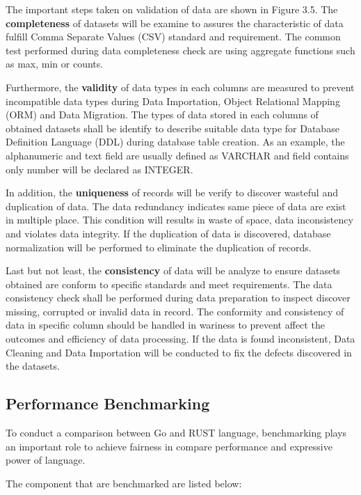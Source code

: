 The important steps taken on validation of data are shown in Figure 3.5. The \textbf{completeness} of datasets will be examine to assures the characteristic of data fulfill Comma Separate Values (CSV) standard and requirement. The common test performed during data completeness check are using aggregate functions such as max, min or counts. \cite{data-completeness-check}

Furthermore, the \textbf{validity} of data types in each columns are measured to prevent incompatible data types during Data Importation, Object Relational Mapping (ORM) and Data Migration. The types of data stored in each columns of obtained datasets shall be identify to describe suitable data type for Database Definition Language (DDL) during database table creation. As an example, the alphanumeric and text field are usually defined as VARCHAR and field contains only number will be declared as INTEGER.  

In addition, the \textbf{uniqueness} of records will be verify to discover wasteful and duplication of data. The data redundancy indicates same piece of data are exist in multiple place. \cite{data-redundancy-definition} This condition will results in waste of space, data inconsistency and violates data integrity. If the duplication of data is discovered, database normalization will be performed to eliminate the duplication of records. 

Last but not least, the \textbf{consistency} of data will be analyze to ensure datasets obtained are conform to specific standards and meet requirements. The data consistency check shall be performed during data preparation to inspect discover missing, corrupted or invalid data in record. The conformity and consistency of data in specific column should be handled in wariness to prevent affect the outcomes and efficiency of data processing. If the data is found inconsistent, Data Cleaning and Data Importation will be conducted to fix the defects discovered in the datasets. 

\subsection{Performance Benchmarking}

To conduct a comparison between Go and RUST language, benchmarking plays an important role to achieve fairness in compare performance and expressive power of language.

The component that are benchmarked are listed below:  

